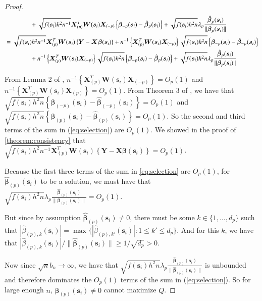 \documentclass[authoryear, review, 11pt]{elsarticle}
\begin{document}
\begin{proof}
\begin{align}
        &\mkern+72mu+ \sqrt{f(\bm{s}_i) h^2 n^{-1}} \bm{X}_{(p)}^T \bm{W}(\bm{s}_i) \bm{X}_{(-p)} \left\{ \bm{\beta}_{-p}(\bm{s}_i) - \hat{\bm{\beta}}_p(\bm{s}_i) \right\} + \sqrt{f(\bm{s}_i) h^2 n} \lambda_p \frac{ \hat{\bm{\beta}}_p(\bm{s}_i) }{\| \bm{\beta}_p(\bm{s}_i) \|} \notag \\
        &= \sqrt{f(\bm{s}_i) h^2 n^{-1}} \bm{X}_{(p)}^T \bm{W}(\bm{s}_i) \left\{ \bm{Y} - \bm{X} \bm{\beta}(\bm{s}_i) \right\} +  n^{-1} \left\{ \bm{X}_{(p)}^T  \bm{W}(\bm{s}_i) \bm{X}_{(-p)} \right\} \sqrt{f(\bm{s}_i) h^2 n} \left\{ \bm{\beta}_{-p}(\bm{s}_i) - \hat{\bm{\beta}}_{-p}(\bm{s}_i) \right\} \notag \\
        &\mkern+72mu+ n^{-1} \left\{ \bm{X}_{(p)}^T \bm{W}(\bm{s}_i) \bm{X}_{(-p)} \right\} \sqrt{f(\bm{s}_i) h^2 n} \left\{ \bm{\beta}_{-p}(\bm{s}_i) - \hat{\bm{\beta}}_p(\bm{s}_i) \right\} + \sqrt{f(\bm{s}_i) h^2 n} \lambda_p \frac{ \hat{\bm{\beta}}_p(\bm{s}_i) }{\| \bm{\beta}_p(\bm{s}_i) \|}
      \end{align}
      
      From Lemma 2 of \cite{Sun-Yan-Zhang-Lu-2014}, $n^{-1} \left\{ \bm{X}_{(p)}^T \bm{W}(\bm{s}_i) \bm{X}_{(-p)} \right\} = O_p(1)$ and $n^{-1} \left\{ \bm{X}_{(p)}^T \bm{W}(\bm{s}_i) \bm{X}_{(p)} \right\} = O_p(1)$. From Theorem 3 of \cite{Sun-Yan-Zhang-Lu-2014}, we have that $\sqrt{f(\bm{s}_i) h^2 n} \left\{ \bm{\beta}_{(-p)} (\bm{s}_i) - \hat{\bm{\beta}}_{(-p)} (\bm{s}_i) \right\} = O_p(1)$ and $\sqrt{f(\bm{s}_i) h^2 n} \left\{ \bm{\beta}_{(p)}(\bm{s}_i) - \hat{\bm{\beta}}_{(p)}(\bm{s}_i) \right\} = O_p(1)$. So the second and third terms of the sum in (\ref{eq:selection}) are $O_p(1)$. We showed in the proof of \ref{theorem:consistency} that $\sqrt{f(\bm{s}_i) h^2 n^{-1}} \bm{X}_{(p)}^T \bm{W}(\bm{s}_i) \left\{ \bm{Y} - \bm{X} \bm{\beta}(\bm{s}_i) \right\} = O_p(1)$.

      Because the first three terms of the sum in \ref{eq:selection} are $O_p(1)$, for $\hat{\bm{\beta}}_{(p)} (\bm{s}_i)$ to be a solution, we must have that $\sqrt{f(\bm{s}_i) h^2 n} \lambda_p \frac{ \hat{\bm{\beta}}_{(p)} (\bm{s}_i) }{\| \bm{\beta}_{(p)} (\bm{s}_i) \|} = O_p(1)$.

      But since by assumption $\hat{\bm{\beta}}_{(p)} (\bm{s}_i) \ne 0$, there must be some $k \in \{ 1, \dots, d_p \}$ such that $ | \hat{\beta}_{(p),k} (\bm{s}_i) | = \max \{ | \hat{\beta}_{(p),k'} (\bm{s}_i) | : 1 \le k' \le d_p \} $. And for this $k$, we have that $| \hat{\beta}_{(p),k} (\bm{s}_i) | / \| \hat{\bm{\beta}}_{(p)} (\bm{s}_i) \| \ge 1 / \sqrt{d_p} > 0$.

      Now since $\sqrt{n} b_n \to \infty$, we have that $\sqrt{f(\bm{s}_i) h^2 n} \lambda_p \frac{ \hat{\bm{\beta}}_{(p)} (\bm{s}_i) }{\| \hat{\bm{\beta}}_{(p)} (\bm{s}_i) \|}$ is unbounded and therefore dominates the $O_p(1)$ terms of the sum in (\ref{eq:selection}). So for large enough $n$, $\hat{\bm{\beta}}_{(p)} (\bm{s}_i) \ne 0$ cannot maximize $Q$.
    \end{proof}
\end{document}
